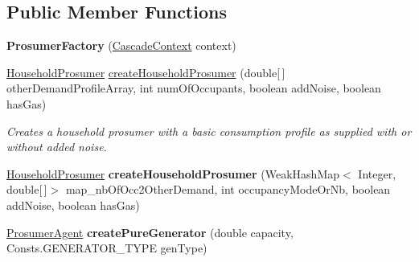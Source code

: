 \subsection*{Public Member Functions}
\begin{DoxyCompactItemize}
\item 
\hypertarget{classuk_1_1ac_1_1dmu_1_1iesd_1_1cascade_1_1agents_1_1prosumers_1_1_prosumer_factory_a2e8c6074859a9062f68b20f52b1d6c4c}{{\bfseries Prosumer\-Factory} (\hyperlink{classuk_1_1ac_1_1dmu_1_1iesd_1_1cascade_1_1context_1_1_cascade_context}{Cascade\-Context} context)}\label{classuk_1_1ac_1_1dmu_1_1iesd_1_1cascade_1_1agents_1_1prosumers_1_1_prosumer_factory_a2e8c6074859a9062f68b20f52b1d6c4c}

\item 
\hyperlink{classuk_1_1ac_1_1dmu_1_1iesd_1_1cascade_1_1agents_1_1prosumers_1_1_household_prosumer}{Household\-Prosumer} \hyperlink{classuk_1_1ac_1_1dmu_1_1iesd_1_1cascade_1_1agents_1_1prosumers_1_1_prosumer_factory_a1f5d95390081bfd30eb94f5d208a73e0}{create\-Household\-Prosumer} (double\mbox{[}$\,$\mbox{]} other\-Demand\-Profile\-Array, int num\-Of\-Occupants, boolean add\-Noise, boolean has\-Gas)
\begin{DoxyCompactList}\small\item\em Creates a household prosumer with a basic consumption profile as supplied with or without added noise. \end{DoxyCompactList}\item 
\hypertarget{classuk_1_1ac_1_1dmu_1_1iesd_1_1cascade_1_1agents_1_1prosumers_1_1_prosumer_factory_ad6711f0104dc0794aec11d0765fd58c6}{\hyperlink{classuk_1_1ac_1_1dmu_1_1iesd_1_1cascade_1_1agents_1_1prosumers_1_1_household_prosumer}{Household\-Prosumer} {\bfseries create\-Household\-Prosumer} (Weak\-Hash\-Map$<$ Integer, double\mbox{[}$\,$\mbox{]}$>$ map\-\_\-nb\-Of\-Occ2\-Other\-Demand, int occupancy\-Mode\-Or\-Nb, boolean add\-Noise, boolean has\-Gas)}\label{classuk_1_1ac_1_1dmu_1_1iesd_1_1cascade_1_1agents_1_1prosumers_1_1_prosumer_factory_ad6711f0104dc0794aec11d0765fd58c6}

\item 
\hypertarget{classuk_1_1ac_1_1dmu_1_1iesd_1_1cascade_1_1agents_1_1prosumers_1_1_prosumer_factory_ad9456eca876d9fb38fc61a3eb4888dbf}{\hyperlink{classuk_1_1ac_1_1dmu_1_1iesd_1_1cascade_1_1agents_1_1prosumers_1_1_prosumer_agent}{Prosumer\-Agent} {\bfseries create\-Pure\-Generator} (double capacity, Consts.\-G\-E\-N\-E\-R\-A\-T\-O\-R\-\_\-\-T\-Y\-P\-E gen\-Type)}\label{classuk_1_1ac_1_1dmu_1_1iesd_1_1cascade_1_1agents_1_1prosumers_1_1_prosumer_factory_ad9456eca876d9fb38fc61a3eb4888dbf}


\end{DoxyCompactItemize}
